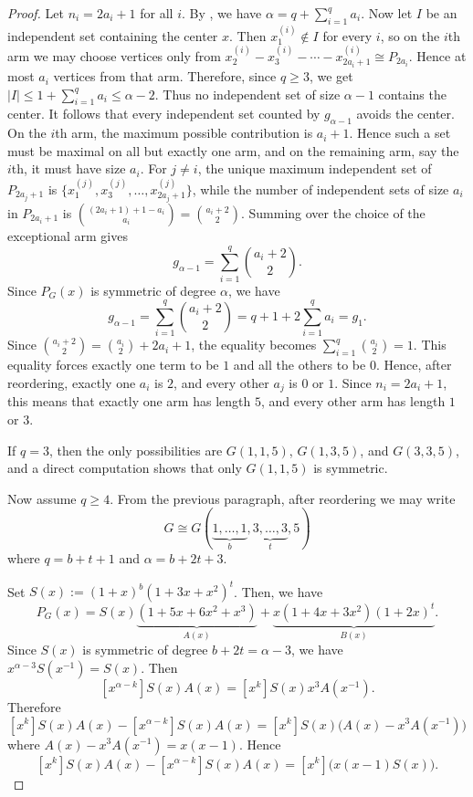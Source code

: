 \documentclass[10pt,a4paper]{amsart}
\begin{document}
\begin{proof}
Let \(n_i=2a_i+1\) for all \(i\). By , we have $\alpha
=q+\sum_{i=1}^q a_i$. Now let \(I\) be an independent set containing the center \(x\). Then \(x^{(i)}_1\notin I\) for every \(i\), so on the \(i\)th arm we may choose vertices only from $x^{(i)}_2-x^{(i)}_3-\cdots-x^{(i)}_{2a_i+1}\cong P_{2a_i}$. Hence at most \(a_i\) vertices from that arm. Therefore, since \(q\ge 3\), we get $|I|\le   1+\sum_{i=1}^q a_i
\le \alpha-2$. Thus no independent set of size \(\alpha-1\) contains the center. It follows that every independent set counted by \(g_{\alpha-1}\) avoids the center. On the \(i\)th arm, the maximum possible contribution is \(a_i+1\).  Hence such a set must be maximal on all but exactly one arm, and on the remaining arm, say the \(i\)th, it must have size \(a_i\). For \(j\neq i\), the unique maximum independent set of \(P_{2a_j+1}\) is
\( \{x^{(j)}_1,x^{(j)}_3,\ldots,x^{(j)}_{2a_j+1}\}
\),
while the number of independent sets of size \(a_i\) in \(P_{2a_i+1}\) is
\(\binom{(2a_i+1)+1-a_i}{a_i}=\binom{a_i+2}{2}\).
Summing over the choice of the exceptional arm gives
\[
g_{\alpha-1}=\sum_{i=1}^q \binom{a_i+2}{2}.
\]
Since \(P_G(x)\) is symmetric of degree \(\alpha\), we have  
\[
g_{\alpha-1}= \sum_{i=1}^q \binom{a_i+2}{2}
=
q+1+2\sum_{i=1}^q a_i=g_1.
\]
Since $\binom{a_i+2}{2}=\binom{a_i}{2}+2a_i+1$,
the equality becomes $\sum_{i=1}^q \binom{a_i}{2}=1$. This equality forces exactly one term to be \(1\) and all the others to be \(0\). Hence, after reordering, exactly one \(a_i\) is \(2\), and every other \(a_j\) is \(0\) or \(1\). Since \(n_i=2a_i+1\), this means that exactly one arm has length \(5\), and every other arm has length \(1\) or \(3\). 


If \(q=3\), then the only possibilities are \(G(1,1,5)\), \(G(1,3,5)\), and \(G(3,3,5)\),
and a direct computation shows that only \(G(1,1,5)\) is symmetric.


Now assume \(q\ge 4\). From the previous paragraph, after reordering we may write
\[
G\cong G(\underbrace{1,\ldots,1}_{b},\underbrace{3,\ldots,3}_{t},5)
\]
where $q=b+t+1$ and $\alpha=b+2t+3$. 


Set $S(x):=(1+x)^b(1+3x+x^2)^t$. 
Then, we have 
\[
P_G(x)=S(x)\underbrace{(1+5x+6x^2+x^3)}_{A(x)}+\underbrace{x(1+4x+3x^2)(1+2x)^t}_{B(x)}.
\]
Since \(S(x)\) is symmetric of degree \(b+2t=\alpha-3\), we have $x^{\alpha-3}S(x^{-1})=S(x)$. Then
\[
[x^{\alpha-k}]S(x)A(x)=[x^k]S(x)x^3A(x^{-1}).
\]
Therefore
\[
[x^k]S(x)A(x)-[x^{\alpha-k}]S(x)A(x)
=
[x^k]S(x)\bigl(A(x)-x^3A(x^{-1})\bigr)
\]
where  $A(x)-x^3A(x^{-1})= x(x-1)$.
Hence
\[
[x^k]S(x)A(x)-[x^{\alpha-k}]S(x)A(x)
=
[x^k]\bigl(x(x-1)S(x)\bigr).
\]


\end{proof}
\end{document}
